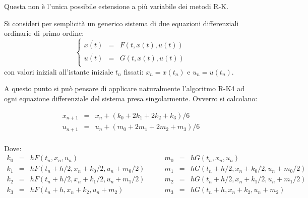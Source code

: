 \documentclass[11pt]{article}
\begin{document}
Questa non è l'unica possibile estensione a più variabile dei metodi R-K.

Si consideri per semplicità un generico sistema di due equazioni differenziali ordinarie di primo ordine:
	\begin{equation}
	\left\{ 
			\begin{array}{rcl}
 			\dot{x(t)} &=& F(t, x(t), u(t))\\
			\dot{u(t)} &=& G(t, x(t), u(t)) \\
			\end{array} \right.
	\end{equation}
con valori iniziali all'istante iniziale $t_{n}$ fissati: $x_{n} = x(t_{n})$ e $u_{n} = u(t_{n})$.

A questo punto si può pensare di applicare naturalmente l'algoritmo R-K4 ad ogni equazione differenziale del sistema presa singolarmente. Ovverro si calcolano:

	\begin{equation}\begin{array}{rcl}
	x_{n+1} &=& x_{n} + (k_{0} + 2 k_{1} + 2 k_{2} + k_{3})/6\\
	u_{n+1} &=& u_{n} + (m_{0} + 2 m_{1} + 2 m_{2} + m_{3})/6\\
	\end{array}\end{equation}

Dove:
\begin{displaymath}
	\begin{array}{rcl}
				k_{0} & = & h F(t_{n} , x_{n} , u_{n}) \\
				k_{1} & = & h F(t_{n} + h/2 , x_{n} + k_{0}/2 , u_{n} + m_{0}/2) \\
				k_{2} & = & h F(t_{n} + h/2 , x_{n} + k_{1}/2, u_{n} + m_{1}/2) \\
				k_{3} & = & h F(t_{n} + h , x_{n} + k_{2}, u_{n} + m_{2}) \\
	\end{array} \qquad
	\begin{array}{rcl}
				m_{0} & = & h G(t_{n} , x_{n} , u_{n}) \\
				m_{1} & = & h G(t_{n} + h/2 , x_{n} + k_{0}/2 , u_{n} + m_{0}/2) \\
				m_{2} & = & h G(t_{n} + h/2 , x_{n} + k_{1}/2, u_{n} + m_{1}/2) \\
				m_{3} & = & h G(t_{n} + h , x_{n} + k_{2}, u_{n} + m_{2}) \\
	\end{array}
\end{displaymath}
\end{document}
